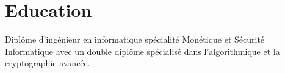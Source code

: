 \documentclass[10pt,a4paper,sans]{moderncv}        %
\begin{document}
\vspace{2ex}
\section{Education}
{
Diplôme d’ingénieur en informatique spécialité Monétique et Sécurité Informatique 
avec un double diplôme spécialisé dans l’algorithmique et la cryptographie avancée.
}   %

%






\end{document}
